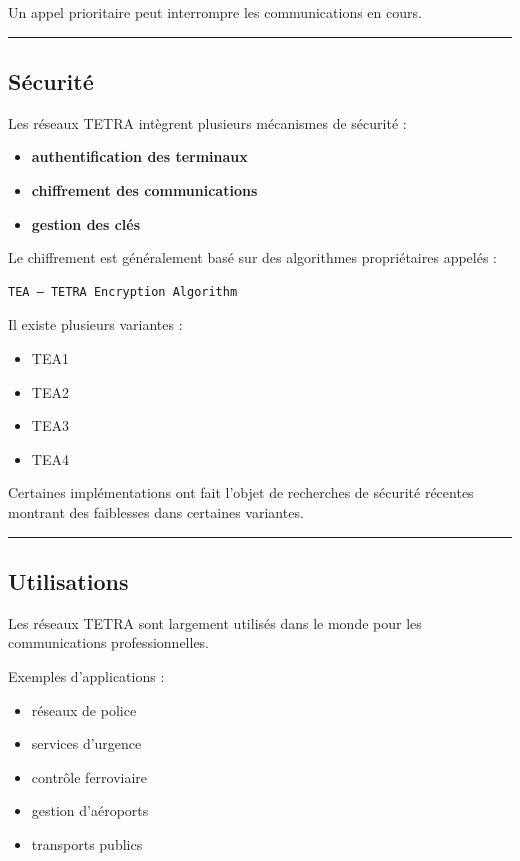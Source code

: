 \documentclass[
  french,
]{article}
\providecommand{\tightlist}{%
  \setlength{\itemsep}{0pt}\setlength{\parskip}{0pt}}
\begin{document}
Un appel prioritaire peut interrompre les communications en cours.

\begin{center}\rule{0.5\linewidth}{0.5pt}\end{center}

\subsection{Sécurité}\label{suxe9curituxe9}

Les réseaux TETRA intègrent plusieurs mécanismes de sécurité :

\begin{itemize}
\tightlist
\item
  \textbf{authentification des terminaux}
\item
  \textbf{chiffrement des communications}
\item
  \textbf{gestion des clés}
\end{itemize}

Le chiffrement est généralement basé sur des algorithmes propriétaires
appelés :

\begin{verbatim}
TEA — TETRA Encryption Algorithm
\end{verbatim}

Il existe plusieurs variantes :

\begin{itemize}
\tightlist
\item
  TEA1
\item
  TEA2
\item
  TEA3
\item
  TEA4
\end{itemize}

Certaines implémentations ont fait l'objet de recherches de sécurité
récentes montrant des faiblesses dans certaines variantes.

\begin{center}\rule{0.5\linewidth}{0.5pt}\end{center}

\subsection{Utilisations}\label{utilisations}

Les réseaux TETRA sont largement utilisés dans le monde pour les
communications professionnelles.

Exemples d'applications :

\begin{itemize}
\tightlist
\item
  réseaux de police
\item
  services d'urgence
\item
  contrôle ferroviaire
\item
  gestion d'aéroports
\item
  transports publics
\end{itemize}
\end{document}
